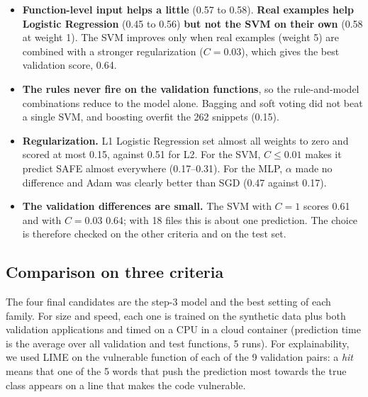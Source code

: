 \documentclass[11pt,a4paper]{article}
\begin{document}
\begin{itemize}
  \item \textbf{Function-level input helps a little} (0.57 to 0.58). \textbf{Real
        examples help Logistic Regression} (0.45 to 0.56) \textbf{but not the SVM on their
        own} (0.58 at weight 1). The SVM improves only when real examples (weight 5) are
        combined with a stronger regularization ($C=0.03$), which gives the best validation
        score, 0.64.
  \item \textbf{The rules never fire on the validation functions}, so the rule-and-model
        combinations reduce to the model alone. Bagging and soft voting did not beat a
        single SVM, and boosting overfit the 262 snippets (0.15).
  \item \textbf{Regularization.} L1 Logistic Regression set almost all weights to zero
        and scored at most 0.15, against 0.51 for L2. For the SVM, $C\le0.01$ makes it
        predict SAFE almost everywhere (0.17--0.31). For the MLP, $\alpha$ made no
        difference and Adam was clearly better than SGD (0.47 against 0.17).
  \item \textbf{The validation differences are small.} The SVM with $C=1$ scores 0.61 and
        with $C=0.03$ 0.64; with 18 files this is about one prediction. The choice is
        therefore checked on the other criteria and on the test set.
\end{itemize}

\subsection{Comparison on three criteria}

The four final candidates are the step-3 model and the best setting of each family. For
size and speed, each one is trained on the synthetic data plus both validation applications
and timed on a CPU in a cloud container (prediction time is the average over all validation and test
functions, 5 runs). For explainability, we used LIME on the vulnerable function of each of
the 9 validation pairs: a \emph{hit} means that one of the 5 words that push the prediction
most towards the true class appears on a line that makes the code vulnerable.
\end{document}
